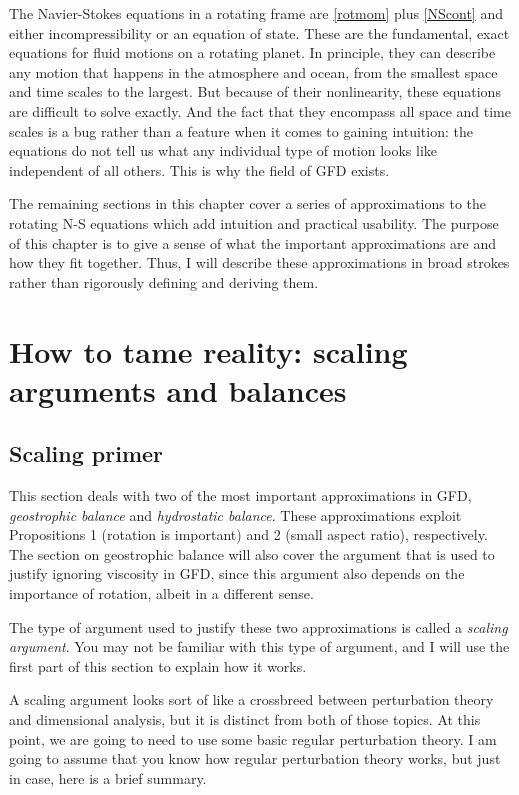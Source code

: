 \documentclass[11pt]{book}
\begin{document}
The Navier-Stokes equations in a rotating frame are \eqref{rotmom} plus \eqref{NScont} and either incompressibility or an equation of state.  These are the fundamental, exact equations for fluid motions on a rotating planet.  In principle, they can describe any motion that happens in the atmosphere and ocean, from the smallest space and time scales to the largest.  But because of their nonlinearity, these equations are difficult to solve exactly.  And the fact that they encompass all space and time scales is a bug rather than a feature when it comes to gaining intuition: the equations do not tell us what any individual type of motion looks like independent of all others.  This is why the field of GFD exists.

The remaining sections in this chapter cover a series of approximations to the rotating N-S equations which add intuition and practical usability.  The purpose of this chapter is to give a sense of what the important approximations are and how they fit together.  Thus, I will describe these approximations in broad strokes rather than rigorously defining and deriving them.
\section{How to tame reality: scaling arguments and balances}
\subsection{Scaling primer}
This section deals with two of the most important approximations in GFD,  \emph{geostrophic balance} and \emph{hydrostatic balance}.  These approximations exploit Propositions 1 (rotation is important) and 2 (small aspect ratio), respectively.  The section on geostrophic balance will also cover the argument that is used to justify ignoring viscosity in GFD, since this argument also depends on the importance of rotation, albeit in a different sense.

The type of argument used to justify these two approximations is called a \emph{scaling argument}.  You may not be familiar with this type of argument, and I will use the first part of this section to explain how it works.

A scaling argument looks sort of like a crossbreed between perturbation theory and dimensional analysis, but it is distinct from both of those topics.  At this point, we are going to need to use some basic regular perturbation theory.  I am going to assume that you know how regular perturbation theory works, but just in case, here is a brief summary.
\end{document}
